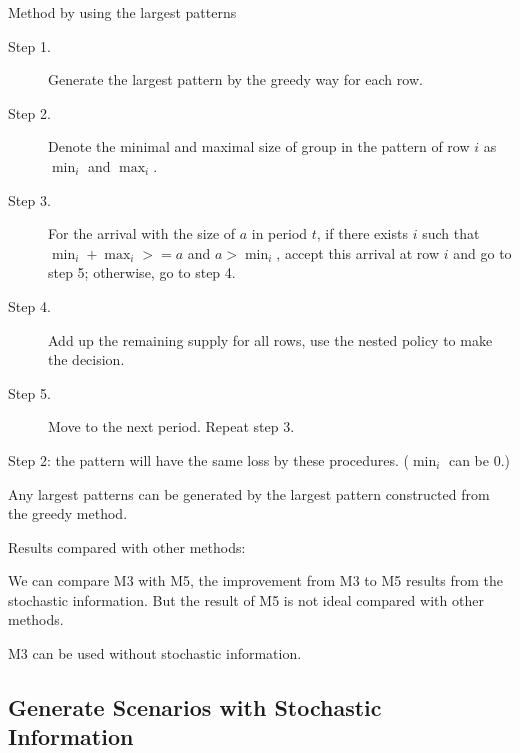 

\begin{algorithm}[H]\label{algo_largest}
  \caption{Method by using the largest patterns}
  \begin{description}
    \item[Step 1.] Generate the largest pattern by the greedy way for each row.
    \item[Step 2.] Denote the minimal and maximal size of group in the pattern of row $i$ as $\min_i$ and $\max_i$. 
    \item[Step 3.] For the arrival with the size of $a$ in period $t$, if there exists $i$ such that $\min_i + \max_i >= a$ and $a > \min_i$, accept this arrival at row $i$ and go to step 5; otherwise, go to step 4.
    \item[Step 4.] Add up the remaining supply for all rows, use the nested policy to make the decision.
    \item[Step 5.] Move to the next period. Repeat step 3. 
  \end{description}
\end{algorithm}

Step 2: the pattern will have the same loss by these procedures. ($\min_i$ can be 0.)

\begin{lem}
  Any largest patterns can be generated by the largest pattern constructed from the greedy method.
\end{lem}

Results compared with other methods:

We can compare M3 with M5, the improvement from M3 to M5 results from the stochastic information. But the result of M5 is not ideal compared with other methods.

M3 can be used without stochastic information.


\subsection{Generate Scenarios with Stochastic Information}\label{MappingSeq}


